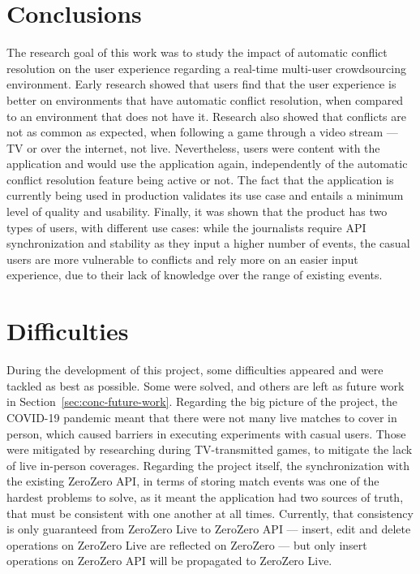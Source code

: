 \section{Conclusions} \label{sec:conc-results}
The research goal of this work was to study the impact of automatic conflict resolution on the user experience regarding a real-time multi-user crowdsourcing environment. Early research showed that users find that the user experience is better on environments that have automatic conflict resolution, when compared to an environment that does not have it. Research also showed that conflicts are not as common as expected, when following a game through a video stream --- TV or over the internet, not live. Nevertheless, users were content with the application and would use the application again, independently of the automatic conflict resolution feature being active or not. The fact that the application is currently being used in production validates its use case and entails a minimum level of quality and usability. Finally, it was shown that the product has two types of users, with different use cases: while the journalists require API synchronization and stability as they input a higher number of events, the casual users are more vulnerable to conflicts and rely more on an easier input experience, due to their lack of knowledge over the range of existing events.

\section{Difficulties} \label{sec:difficulties}
During the development of this project, some difficulties appeared and were tackled as best as possible. Some were solved, and others are left as future work in Section~\ref{sec:conc-future-work}. Regarding the big picture of the project, the COVID-19 pandemic meant that there were not many live matches to cover in person, which caused barriers in executing experiments with casual users. Those were mitigated by researching during TV-transmitted games, to mitigate the lack of live in-person coverages. Regarding the project itself, the synchronization with the existing ZeroZero API, in terms of storing match events was one of the hardest problems to solve, as it meant the application had two sources of truth, that must be consistent with one another at all times. Currently, that consistency is only guaranteed from ZeroZero Live to ZeroZero API --- insert, edit and delete operations on ZeroZero Live are reflected on ZeroZero --- but only insert operations on ZeroZero API will be propagated to ZeroZero Live.

